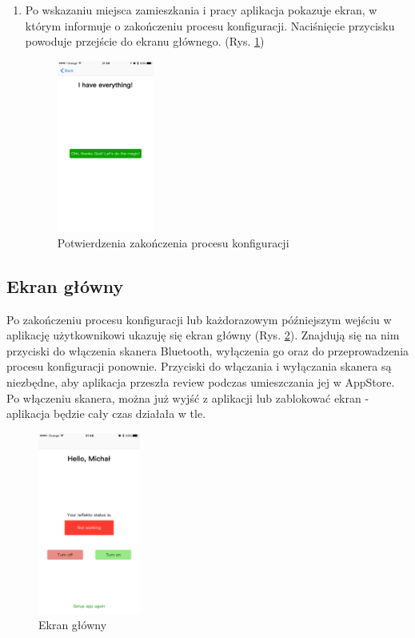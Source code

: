 \documentclass[a4paper,11pt]{article}
\begin{document}
\begin{enumerate}
\item Po wskazaniu miejsca zamieszkania i pracy aplikacja pokazuje ekran, w którym informuje o zakończeniu procesu konfiguracji. Naciśnięcie przycisku powoduje przejście do ekranu głównego. (Rys. \ref{setup7})
\begin{figure}[H]
	\includegraphics[width=0.3\textwidth,center]{ios-screens/setup7.png}
	\caption {Potwierdzenia zakończenia procesu konfiguracji}
	\label{setup7}
\end{figure}

\end{enumerate}


\subsection{Ekran główny}
Po zakończeniu procesu konfiguracji lub każdorazowym późniejszym wejściu w aplikację użytkownikowi ukazuję się ekran główny (Rys. \ref{main_ios}). Znajdują się na nim przyciski do włączenia skanera Bluetooth, wyłączenia go oraz do przeprowadzenia procesu konfiguracji ponownie. Przyciski do włączania i wyłączania skanera są niezbędne, aby aplikacja przeszła review podczas umieszczania jej w AppStore. Po włączeniu skanera, można już wyjść z aplikacji lub zablokować ekran - aplikacja będzie cały czas działała w tle.

\begin{figure}[H]
	\includegraphics[width=0.3\textwidth,center]{ios-screens/main.png}
	\caption {Ekran główny}
	\label{main_ios}
\end{figure}
\end{document}
